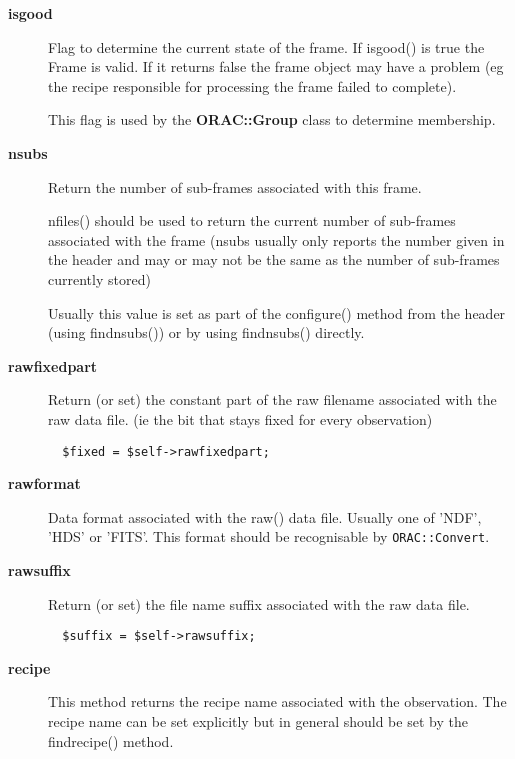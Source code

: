 \begin{description}
\begin{description}
\begin{description}
\item[{\textbf{isgood}}] \mbox{}

Flag to determine the current state of the frame. If isgood() is true
the Frame is valid. If it returns false the frame object may have a
problem (eg the recipe responsible for processing the frame failed to
complete).



This flag is used by the \textbf{ORAC::Group} class to determine membership.


\item[{\textbf{nsubs}}] \mbox{}

Return the number of sub-frames associated with this frame.



nfiles() should be used to return the current number of sub-frames
associated with the frame (nsubs usually only reports the number given
in the header and may or may not be the same as the number of
sub-frames currently stored)



Usually this value is set as part of the configure() method from the
header (using findnsubs()) or by using findnsubs() directly.


\item[{\textbf{rawfixedpart}}] \mbox{}

Return (or set) the constant part of the raw filename associated
with the raw data file. (ie the bit that stays fixed for every
observation)

\begin{verbatim}
  $fixed = $self->rawfixedpart;
\end{verbatim}

\item[{\textbf{rawformat}}] \mbox{}

Data format associated with the raw() data file.
Usually one of 'NDF', 'HDS' or 'FITS'. This format should be
recognisable by \texttt{ORAC::Convert}.


\item[{\textbf{rawsuffix}}] \mbox{}

Return (or set) the file name suffix associated with
the raw data file.

\begin{verbatim}
  $suffix = $self->rawsuffix;
\end{verbatim}

\item[{\textbf{recipe}}] \mbox{}

This method returns the recipe name associated with the observation.
The recipe name can be set explicitly but in general should be
set by the findrecipe() method.


\end{description}
\end{description}
\end{description}
